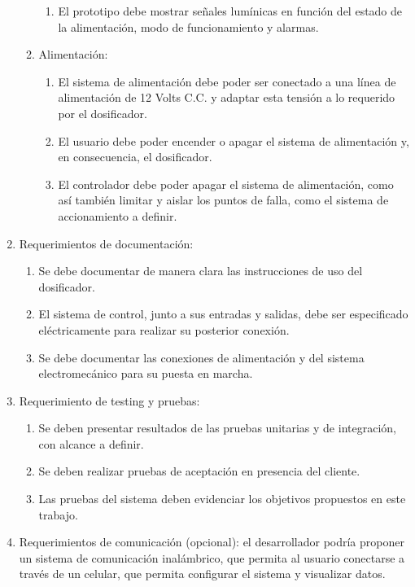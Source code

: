 \documentclass[
11pt, %
]{charter}
\begin{document}
\begin{enumerate}
\begin{enumerate}
\begin{enumerate}
			\item El prototipo debe mostrar señales lumínicas en función del estado de la alimentación, modo de funcionamiento y alarmas.
			\end{enumerate}
			\item Alimentación:
			\begin{enumerate}
			\item El sistema de alimentación debe poder ser conectado a una línea de alimentación de 12 Volts C.C. y adaptar esta tensión a lo requerido por el dosificador.
			\item El usuario debe poder encender o apagar el sistema de alimentación y, en consecuencia, el dosificador.
			\item El controlador debe poder apagar el sistema de alimentación, como así también limitar y aislar los puntos de falla, como el sistema de accionamiento a definir.
			\end{enumerate}
		\end{enumerate}
		
	\item Requerimientos de documentación:
		\begin{enumerate}
			\item Se debe documentar de manera clara las instrucciones de uso del dosificador.
			\item El sistema de control, junto a sus entradas y salidas, debe ser especificado eléctricamente para realizar su posterior conexión.
			\item Se debe documentar las conexiones de alimentación y del sistema electromecánico para su puesta en marcha.
		\end{enumerate}
		
	\item Requerimiento de testing y pruebas:
		\begin{enumerate}
			\item Se deben presentar resultados de las pruebas unitarias y de integración, con alcance a definir.
			\item Se deben realizar pruebas de aceptación en presencia del cliente.
			\item Las pruebas del sistema deben evidenciar los objetivos propuestos en este trabajo.
		\end{enumerate}
		
	\item Requerimientos de comunicación (opcional): el desarrollador podría proponer un sistema de comunicación inalámbrico, que permita al usuario conectarse a través de un celular, que permita configurar el sistema y visualizar datos.
\end{enumerate}
\end{document}
